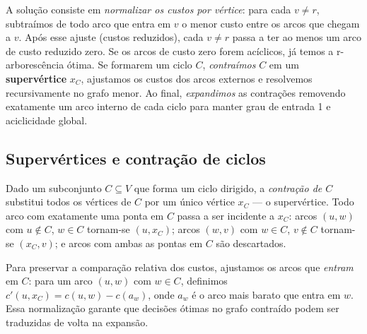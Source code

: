 A solução consiste em \emph{normalizar os custos por vértice}: para cada \(v\neq r\), subtraímos de todo arco que entra em \(v\) o menor custo entre os arcos que chegam a \(v\). Após esse ajuste (custos reduzidos), cada \(v\neq r\) passa a ter ao menos um arco de custo reduzido zero. Se os arcos de custo zero forem acíclicos, já temos a r-arborescência ótima. Se formarem um ciclo \(C\), \emph{contraímos} \(C\) em um \textbf{supervértice} \(x_C\), ajustamos os custos dos arcos externos e resolvemos recursivamente no grafo menor. Ao final, \emph{expandimos} as contrações removendo exatamente um arco interno de cada ciclo para manter grau de entrada 1 e aciclicidade global.

\subsection{Supervértices e contração de ciclos}

Dado um subconjunto \(C\subseteq V\) que forma um ciclo dirigido, a \emph{contração de \(C\)} substitui todos os vértices de \(C\) por um único vértice \(x_C\) — o supervértice. Todo arco com exatamente uma ponta em \(C\) passa a ser incidente a \(x_C\): arcos \((u,w)\) com \(u\notin C\), \(w\in C\) tornam-se \((u, x_C)\); arcos \((w,v)\) com \(w\in C\), \(v\notin C\) tornam-se \((x_C, v)\); e arcos com ambas as pontas em \(C\) são descartados.

Para preservar a comparação relativa dos custos, ajustamos os arcos que \emph{entram} em \(C\): para um arco \((u,w)\) com \(w\in C\), definimos \(c'(u,x_C) = c(u,w) - c(a_w)\), onde \(a_w\) é o arco mais barato que entra em \(w\). Essa normalização garante que decisões ótimas no grafo contraído podem ser traduzidas de volta na expansão.

